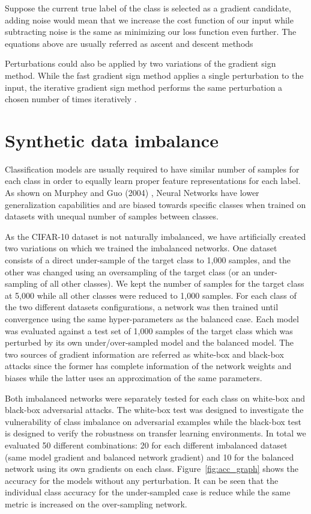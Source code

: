 Suppose the current true label of the class is selected as a gradient candidate, adding noise would mean that we increase the cost function of our input while subtracting noise is the same as minimizing our loss function even further. The equations above are usually referred as ascent and descent methods

Perturbations could also be applied by two variations of the gradient sign method. While the fast gradient sign method applies a single perturbation to the input, the iterative gradient sign method performs the same perturbation a chosen number of times iteratively \cite{goodfellow2014}. 
\section{Synthetic data imbalance}

Classification models are usually required to have similar number of samples for each class in order to equally learn proper feature representations for each label. As shown on Murphey and Guo (2004) \cite{murphey2004}, Neural Networks have lower generalization capabilities and are biased towards specific classes when trained on datasets with unequal number of samples between classes. 

As the CIFAR-10 dataset is not naturally imbalanced, we have artificially created two variations on which we trained the imbalanced networks.  One dataset consists of a direct under-sample of the target class to 1,000 samples, and the other was changed using  an oversampling of the target class (or an under-sampling of all other classes). We kept the number of samples for the target class at 5,000 while all other classes were reduced to 1,000 samples. For each class of the two different datasets configurations, a network was then trained until convergence using the same hyper-parameters as the balanced case. Each model was evaluated against a test set of 1,000 samples of the target class which was  perturbed by its own under/over-sampled model and the balanced model. The two sources of gradient information are referred as white-box and black-box attacks since the former has complete information of the network weights and biases while the latter uses an approximation of the same parameters. 

Both imbalanced networks were separately tested for each class on white-box and black-box adversarial attacks. The white-box test was designed to investigate the vulnerability of class imbalance on adversarial examples while the black-box test is designed to verify the robustness on transfer learning environments. In total we evaluated 50 different combinations: 20 for each different imbalanced dataset (same model gradient and balanced network gradient) and 10 for the balanced network using its own gradients on each class. Figure~\ref{fig:acc_graph} shows the accuracy for the models without any perturbation. It can be seen that the individual class accuracy for the under-sampled case is reduce while the same metric is increased on the over-sampling network. 

